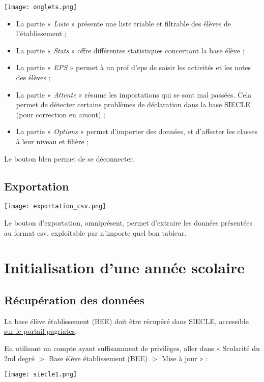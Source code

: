\documentclass[11pt,a4paper]{article}
\newcommand{\bouton}[1]{« \textit{#1} »}
\begin{document}
\texttt{[image: onglets.png]}

\begin{itemize}
\item La partie \bouton{Liste} présente une liste triable et filtrable des élèves de l'établissement ;
\item La partie \bouton{Stats} offre différentes statistiques concernant la base élève ;
\item La partie \bouton{EPS} permet à un prof d'eps de saisir les activités et les notes des élèves ;
\item La partie \bouton{Attente} résume les importations qui se sont mal passées. Cela permet de détecter certains problèmes de déclaration dans la base SIECLE (pour correction en amont) ;
\item La partie \bouton{Options} permet d'importer des données, et d'affecter les classes à leur niveau et filière ;
\end{itemize}

Le bouton bleu permet de se déconnecter.

\subsection{Exportation}

\texttt{[image: exportation\_csv.png]}

Le bouton d'exportation, omniprésent, permet d'extraire les données présentées au format csv, exploitable par n'importe quel bon tableur.

\pagebreak
\section{Initialisation d'une année scolaire}
\subsection{Récupération des données}
La base élève établissement (BEE) doit être récupéré dans SIECLE, accessible \href{http://pagriates.ac-lille.fr/}{sur le portail pagriates}.

En utilisant un compte ayant suffisamment de privilèges, aller dans « Scolarité du 2nd degré $>$ Base élève établissement (BEE) $>$ Mise à jour » :

\texttt{[image: siecle1.png]}
\end{document}

